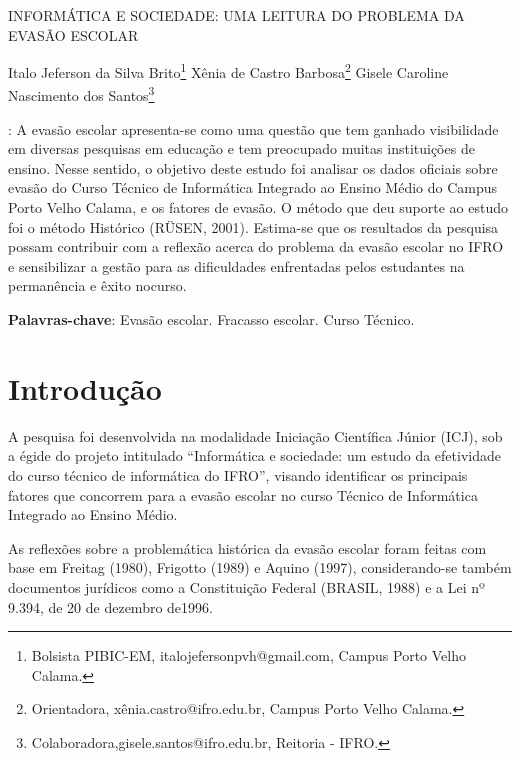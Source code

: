 \documentclass[article,12pt,onesidea,4paper,english,brazil]{abntex2}
\begin{document}
	
	
	\frenchspacing 
	
	\begin{center}
		\LARGE 
		INFORMÁTICA E SOCIEDADE: UMA LEITURA DO PROBLEMA DA EVASÃO ESCOLAR
		
		
		\normalsize
		Italo Jeferson da Silva Brito\footnote{Bolsista PIBIC-EM, italojefersonpvh@gmail.com, Campus Porto Velho Calama.} 
		Xênia de Castro Barbosa\footnote{Orientadora, xênia.castro@ifro.edu.br, Campus Porto Velho Calama.} 
		Gisele Caroline Nascimento dos Santos\footnote{Colaboradora,gisele.santos@ifro.edu.br, Reitoria - IFRO.} 
	
	\end{center}
	
	\begin{resumoumacoluna}
		: A evasão escolar apresenta-se como uma questão que tem ganhado visibilidade em diversas pesquisas em educação e tem preocupado muitas instituições de ensino. Nesse sentido, o objetivo deste estudo foi analisar os dados oficiais sobre evasão do Curso Técnico de Informática Integrado ao Ensino Médio do Campus Porto Velho Calama, e os fatores de evasão. O método que deu suporte ao estudo foi o método Histórico (RÜSEN, 2001). Estima-se que os resultados da pesquisa possam contribuir com a reflexão acerca do problema da evasão escolar no IFRO e sensibilizar a gestão para as dificuldades enfrentadas pelos estudantes na permanência e êxito nocurso.
		
		\vspace{\onelineskip}
		
		\noindent
		\textbf{Palavras-chave}: Evasão escolar. Fracasso escolar. Curso Técnico.
	\end{resumoumacoluna}
	
	\section*{Introdução}
	
	A pesquisa foi desenvolvida na modalidade Iniciação Científica Júnior (ICJ), sob a égide do projeto intitulado “Informática e sociedade: um estudo da efetividade do curso técnico de informática do IFRO”, visando identificar os principais fatores que concorrem para a evasão escolar no curso Técnico de Informática Integrado ao Ensino Médio.
	
	As reflexões sobre a problemática histórica da evasão escolar foram feitas com base em Freitag (1980), Frigotto (1989) e Aquino (1997), considerando-se também documentos jurídicos como a Constituição Federal (BRASIL, 1988) e a Lei nº 9.394, de 20 de dezembro de1996.
	
\end{document}

